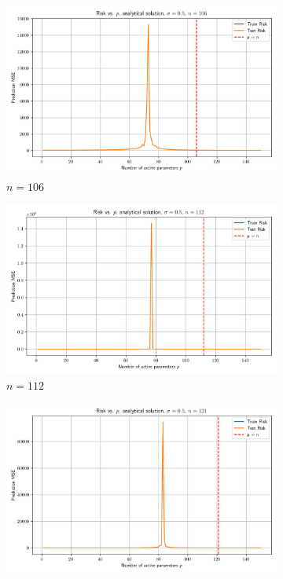 \documentclass[twoside,10pt]{article}
\begin{document}
\begin{figure}[htb]
  \begin{subfigure}[b]{\imgwidth}
    \includegraphics[width=\linewidth]{img2/risk_curve_n106.png}
    \caption{$n=106$}\label{fig:2i}
  \end{subfigure}%
  \hfill
  \begin{subfigure}[b]{\imgwidth}
    \includegraphics[width=\linewidth]{img2/risk_curve_n112.png}
    \caption{$n=112$}\label{fig:2j}
  \end{subfigure}%
  \hfill
  \begin{subfigure}[b]{\imgwidth}
    \includegraphics[width=\linewidth]{img2/risk_curve_n121.png}

\end{subfigure}
\end{figure}
\end{document}

